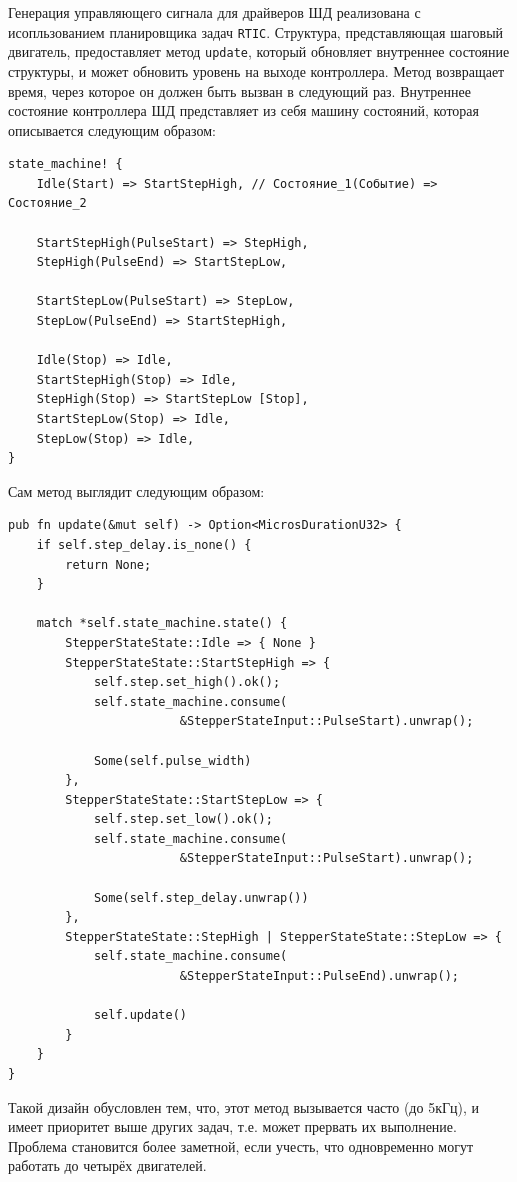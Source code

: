 \documentclass[11pt]{article}
\begin{document}
Генерация управляющего сигнала для драйверов ШД реализована с исопльзованием планировщика задач \texttt{RTIC}. Структура, представляющая шаговый двигатель, предоставляет метод \texttt{update}, который обновляет внутреннее состояние структуры, и может обновить уровень на выходе контроллера. Метод возвращает время, через которое он должен быть вызван в следующий раз. Внутреннее состояние контроллера ШД представляет из себя машину состояний, которая описывается следующим образом:
\begin{verbatim}
state_machine! {
    Idle(Start) => StartStepHigh, // Состояние_1(Событие) => Состояние_2

    StartStepHigh(PulseStart) => StepHigh,
    StepHigh(PulseEnd) => StartStepLow,

    StartStepLow(PulseStart) => StepLow,
    StepLow(PulseEnd) => StartStepHigh,

    Idle(Stop) => Idle,
    StartStepHigh(Stop) => Idle,
    StepHigh(Stop) => StartStepLow [Stop],
    StartStepLow(Stop) => Idle,
    StepLow(Stop) => Idle,
}
\end{verbatim}

Сам метод выглядит следующим образом:
\begin{verbatim}
pub fn update(&mut self) -> Option<MicrosDurationU32> {
    if self.step_delay.is_none() {
        return None;
    }

    match *self.state_machine.state() {
        StepperStateState::Idle => { None }
        StepperStateState::StartStepHigh => {
            self.step.set_high().ok();
            self.state_machine.consume(
                        &StepperStateInput::PulseStart).unwrap();

            Some(self.pulse_width)
        },
        StepperStateState::StartStepLow => {
            self.step.set_low().ok();
            self.state_machine.consume(
                        &StepperStateInput::PulseStart).unwrap();

            Some(self.step_delay.unwrap())
        },
        StepperStateState::StepHigh | StepperStateState::StepLow => {
            self.state_machine.consume(
                        &StepperStateInput::PulseEnd).unwrap();

            self.update()
        }
    }
}
\end{verbatim}

Такой дизайн обусловлен тем, что, этот метод вызывается часто (до 5кГц), и имеет приоритет выше других задач, т.е. может прервать их выполнение. Проблема становится более заметной, если учесть, что одновременно могут работать до четырёх двигателей.
\end{document}
